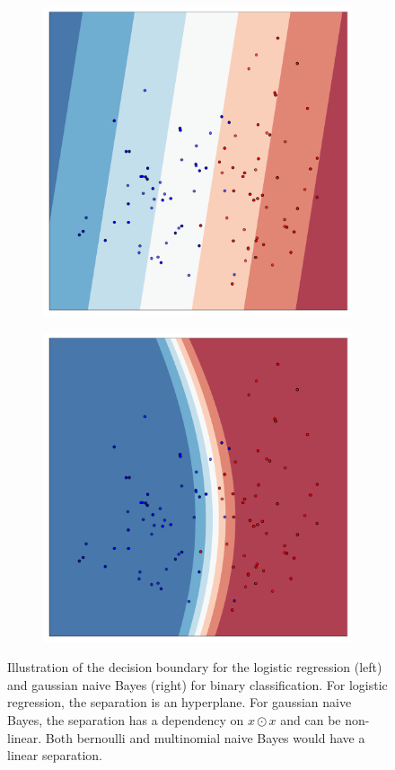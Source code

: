 \begin{figure}
    \centering
    \begin{subfigure}{.5\textwidth}
        \centering
        \includegraphics[width=0.75\linewidth]{figures/log_reg_classification.pdf}
        \label{fig:log_reg_classification}
    \end{subfigure}%
    \begin{subfigure}{.5\textwidth}
        \centering
        \includegraphics[width=0.75\linewidth]{figures/nb_classification.pdf}
        \label{fig:nb_classification}
    \end{subfigure}
    \caption{
        Illustration of the decision boundary for the logistic regression (left)
        and gaussian naive Bayes (right) for binary classification.
        For logistic regression, the separation is an hyperplane.
        For gaussian naive Bayes, the separation has a dependency on $x \odot x$ and can be non-linear.
        Both bernoulli and multinomial naive Bayes would have a linear separation.
    }
    \label{fig:log_reg_nb_comparison}
\end{figure}

